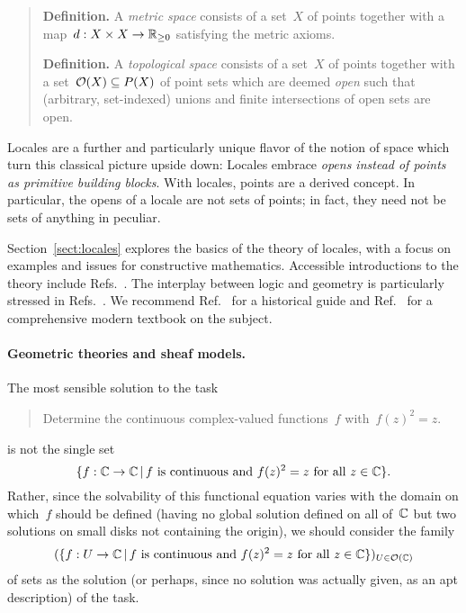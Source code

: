 \documentclass{ws-rv9x6}
\begin{document}
{%
\begin{quote}
\textbf{Definition.} A \emph{metric space} consists of a set~$X$ of points
together with a map~$d : X \times X \to \mathbb{R}_{\geq 0}$ satisfying the metric
axioms.

\textbf{Definition.} A \emph{topological space} consists of a set~$X$ of points
together with a set~$\mathcal{O}(X) \subseteq P(X)$ of point sets which are deemed
\emph{open} such that (arbitrary, set-indexed) unions and finite intersections
of open sets are open.
\end{quote}

Locales are a further and particularly unique flavor of the notion of space
which turn this classical picture upside down: Locales embrace \emph{opens
instead of points as primitive building blocks}. With locales, points are a
derived concept. In particular, the opens of a locale are not sets of points;
in fact, they need not be sets of anything in peculiar.

Section~\ref{sect:locales} explores the basics of the theory of locales, with a
focus on examples and issues for constructive mathematics. Accessible
introductions to the theory include
Refs.~. The interplay between logic and
geometry is particularly stressed in
Refs.~. We recommend
Ref.~ for a historical guide and
Ref.~ for a comprehensive modern
textbook on the subject.


\paragraph{Geometric theories and sheaf models.} The most sensible solution to
the task
\begin{quote}
Determine the continuous complex-valued functions~$f$ with~$f(z)^2 = z$.
\end{quote}
is not the single set
\[ \{ f : \mathbb{C} \to \mathbb{C} \,|\, \text{$f$ is continuous and $f(z)^2 = z$ for all~$z \in \mathbb{C}$} \}. \]
Rather, since the solvability of this functional equation varies with the
domain on which~$f$ should be defined (having no global solution defined on all
of~$\mathbb{C}$ but two solutions on small disks not containing the origin), we should
consider the family
\[ (\{ f : U \to \mathbb{C} \,|\, \text{$f$ is continuous and $f(z)^2 = z$ for all~$z
\in \mathbb{C}$} \})_{U \in \mathcal{O}(\mathbb{C})} \]
of sets as the solution (or perhaps, since no solution was actually given, as
an apt description) of the task.

}
\end{document}
